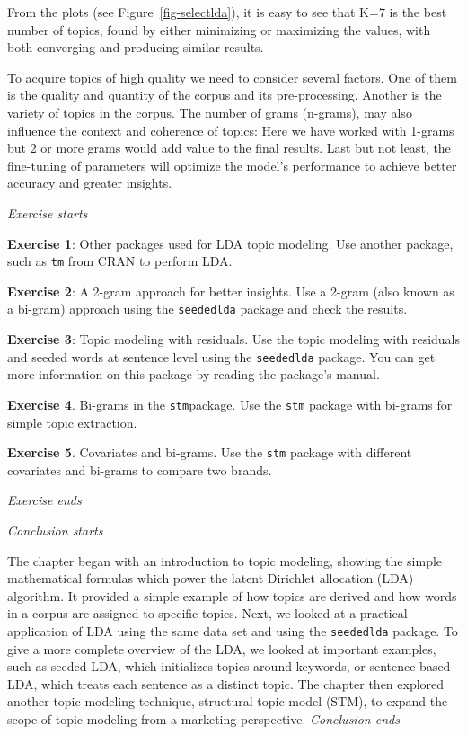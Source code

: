 From the plots (see Figure~\ref{fig-selectlda}), it is easy to
see that K=7 is the best number of topics, found by either
minimizing or maximizing the values, with both converging and producing similar results.

To acquire topics of high quality we need to consider several factors.
One of them is the quality and quantity of the corpus and its
pre-processing. Another is the variety of topics in the
corpus. The number of grams (n-grams), may also influence the
context and coherence of topics: Here we have worked with 1-grams but 2
or more grams would add value to the final results. Last but not least, the
fine-tuning of parameters will optimize the model's performance to achieve better
accuracy and greater insights.

\emph{Exercise starts}

\textbf{Exercise 1}: Other packages used for LDA topic modeling. Use
another package, such as \texttt{tm} from CRAN to perform LDA.

\textbf{Exercise 2}: A 2-gram approach for better insights. Use a 2-gram
(also known as a bi-gram) approach using the \texttt{seededlda} package and
check the results.

\textbf{Exercise 3}: Topic modeling with residuals. Use the topic
modeling with residuals and seeded words at sentence level using the
\texttt{seededlda} package. You can get more information on this package
by reading the package's manual.

\textbf{Exercise 4}. Bi-grams in the \texttt{stm}package. Use the
\texttt{stm} package with bi-grams for simple topic extraction.

\textbf{Exercise 5}. Covariates and bi-grams. Use the \texttt{stm}
package with different covariates and bi-grams to compare two brands.

\emph{Exercise ends}

\emph{Conclusion starts}

The chapter began with an introduction to topic modeling, showing the
simple mathematical formulas which power the latent Dirichlet allocation
(LDA) algorithm. It provided a simple example of how topics are derived and how
words in a corpus are assigned to specific topics. Next, we looked at a practical application of LDA using the same data set
and using the \texttt{seededlda} package. To give a more complete overview of the LDA, we looked at important examples, such as seeded LDA, which initializes topics around
keywords, or sentence-based LDA, which treats each sentence as a
distinct topic. The
chapter then explored another topic modeling technique, structural topic
model (STM), to expand the scope of topic modeling from a
marketing perspective. \emph{Conclusion ends}


